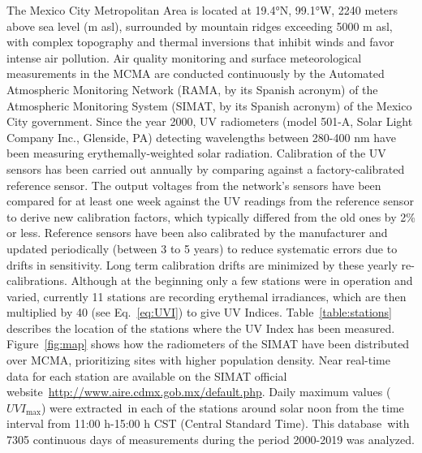 \documentclass[journal=jacsat,manuscript=article]{achemso}
\begin{document}
The Mexico City Metropolitan Area is located at 19.4°N, 99.1°W, 2240
meters above sea level (m asl), surrounded by mountain ridges exceeding
5000 m asl, with complex topography and thermal inversions that inhibit
winds and favor intense air pollution.\citep{Whiteman_2000,Fast_2007,Carre_n_Sierra_2015}
Air quality
monitoring and surface meteorological measurements in the MCMA are
conducted continuously by the Automated Atmospheric Monitoring Network
(RAMA, by its Spanish acronym) of the Atmospheric Monitoring System
(SIMAT, by its Spanish acronym) of the Mexico City government. Since the
year 2000, UV radiometers (model 501-A, Solar Light Company Inc.,
Glenside, PA) detecting wavelengths between 280-400 nm have been
measuring erythemally-weighted solar radiation. Calibration of the
UV sensors has been carried out annually by comparing against a
factory-calibrated reference sensor. The output voltages from the
network’s sensors have been compared for at least one week against the UV
readings from the reference sensor to derive new calibration factors, which typically differed
from the old ones by 2\% or less.
Reference sensors have been also calibrated by the manufacturer and updated
periodically (between 3 to 5 years) to reduce systematic errors due to drifts in sensitivity.
Long term calibration drifts are minimized by these yearly re-calibrations.
Although at the beginning only a few stations were in operation and
varied, currently 11 stations are recording erythemal
irradiances, which are then multiplied by 40 (see
Eq.~{\ref{eq:UVI}}) to give UV Indices.
Table~{\ref{table:stations}} describes the location of
the stations where the UV Index has been measured.
Figure~{\ref{fig:map}} shows how the radiometers of the
SIMAT have been distributed over MCMA, prioritizing sites with higher population density.
Near real-time data for each station are
available on the SIMAT official
website~\url{http://www.aire.cdmx.gob.mx/default.php}. Daily maximum
values (\(UVI_{\max}\)) were extracted~in each of the stations
around solar noon from the time interval from 11:00 h-15:00 h CST
(Central Standard Time). This database~with 7305 continuous days of
measurements during the period 2000-2019 was analyzed.
\end{document}
